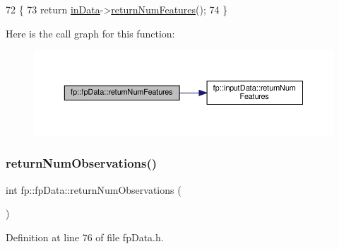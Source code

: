\begin{DoxyCode}
72                                           \{
73                 \textcolor{keywordflow}{return} \hyperlink{classfp_1_1fpData_a49d7c3f58bcf88843c25b1b0c9714ebe}{inData}->\hyperlink{classfp_1_1inputData_ae9362286ea7706a8b0d91ba96e9ad478}{returnNumFeatures}();
74             \}
\end{DoxyCode}
Here is the call graph for this function\+:
\nopagebreak
\begin{figure}[H]
\begin{center}
\leavevmode
\includegraphics[width=350pt]{classfp_1_1fpData_a95088e33b280e5c82b3543033d8852e1_cgraph}
\end{center}
\end{figure}
\mbox{\label{classfp_1_1fpData_a9056a8c0e7e48fe9aa591269064ecc43}} 
\subsubsection{\texorpdfstring{return\+Num\+Observations()}{returnNumObservations()}}
{\footnotesize\ttfamily int fp\+::fp\+Data\+::return\+Num\+Observations (\begin{DoxyParamCaption}{ }\end{DoxyParamCaption})\hspace{0.3cm}{\ttfamily [inline]}}



Definition at line 76 of file fp\+Data.\+h.


